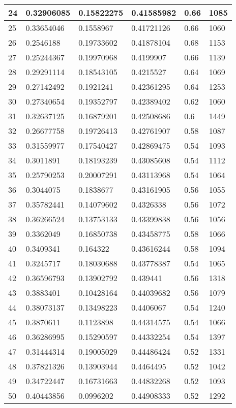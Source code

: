 \begin{longtable}{|l|l|l|l|l|l|}
24 & 0.32906085 & 0.15822275 & 0.41585982 & 0.66 & 1085 \\ \hline 
25 & 0.33654046 & 0.1558967 & 0.41721126 & 0.66 & 1060 \\ \hline 
26 & 0.2546188 & 0.19733602 & 0.41878104 & 0.68 & 1153 \\ \hline 
27 & 0.25244367 & 0.19970968 & 0.4199907 & 0.66 & 1139 \\ \hline 
28 & 0.29291114 & 0.18543105 & 0.4215527 & 0.64 & 1069 \\ \hline 
29 & 0.27142492 & 0.1921241 & 0.42361295 & 0.64 & 1253 \\ \hline 
30 & 0.27340654 & 0.19352797 & 0.42389402 & 0.62 & 1060 \\ \hline 
31 & 0.32637125 & 0.16879201 & 0.42508686 & 0.6 & 1449 \\ \hline 
32 & 0.26677758 & 0.19726413 & 0.42761907 & 0.58 & 1087 \\ \hline 
33 & 0.31559977 & 0.17540427 & 0.42869475 & 0.54 & 1093 \\ \hline 
34 & 0.3011891 & 0.18193239 & 0.43085608 & 0.54 & 1112 \\ \hline 
35 & 0.25790253 & 0.20007291 & 0.43113968 & 0.54 & 1064 \\ \hline 
36 & 0.3044075 & 0.1838677 & 0.43161905 & 0.56 & 1055 \\ \hline 
37 & 0.35782441 & 0.14079602 & 0.4326338 & 0.56 & 1072 \\ \hline 
38 & 0.36266524 & 0.13753133 & 0.43399838 & 0.56 & 1056 \\ \hline 
39 & 0.3362049 & 0.16850738 & 0.43458775 & 0.58 & 1066 \\ \hline 
40 & 0.3409341 & 0.164322 & 0.43616244 & 0.58 & 1094 \\ \hline 
41 & 0.3245717 & 0.18030688 & 0.43778387 & 0.54 & 1065 \\ \hline 
42 & 0.36596793 & 0.13902792 & 0.439441 & 0.56 & 1318 \\ \hline 
43 & 0.3883401 & 0.10428164 & 0.44039682 & 0.56 & 1079 \\ \hline 
44 & 0.38073137 & 0.13498223 & 0.4406067 & 0.54 & 1240 \\ \hline 
45 & 0.3870611 & 0.1123898 & 0.44314575 & 0.54 & 1066 \\ \hline 
46 & 0.36286995 & 0.15290597 & 0.44332254 & 0.54 & 1397 \\ \hline 
47 & 0.31444314 & 0.19005029 & 0.44486424 & 0.52 & 1331 \\ \hline 
48 & 0.37821326 & 0.13903944 & 0.4464495 & 0.52 & 1042 \\ \hline 
49 & 0.34722447 & 0.16731663 & 0.44832268 & 0.52 & 1093 \\ \hline 
50 & 0.40443856 & 0.0996202 & 0.44908333 & 0.52 & 1292 \\ \hline 
\end{longtable}